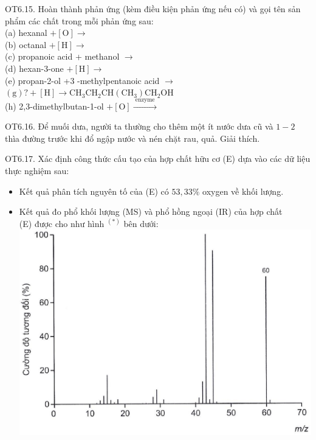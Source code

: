 \documentclass[10pt]{article}
\begin{document}
OT6.15. Hoàn thành phản ứng (kèm điều kiện phản ứng nếu có) và gọi tên sản\\
phẩm các chất trong mỗi phản ứng sau:\\
(a) hexanal $+[\mathrm{O}] \rightarrow$\\
(b) octanal $+[\mathrm{H}] \rightarrow$\\
(c) propanoic acid + methanol $\rightarrow$\\
(d) hexan-3-one $+[\mathrm{H}] \rightarrow$\\
(e) propan-2-ol +3 -methylpentanoic acid $\rightarrow$\\
$(\mathrm{g}) ?+[\mathrm{H}] \rightarrow \mathrm{CH}_{3} \mathrm{CH}_{2} \mathrm{CH}\left(\mathrm{CH}_{3}\right) \mathrm{CH}_{2} \mathrm{OH}$\\
(h) 2,3-dimethylbutan-1-ol $+[\mathrm{O}] \xrightarrow{\text { enzyme }}$

OT6.16. Để muối dưa, người ta thường cho thêm một ít nước dưa cũ và $1-2$ thìa đường trước khi đổ ngập nước và nén chặt rau, quả. Giải thích.

OT6.17. Xác định công thức cấu tạo của hợp chất hữu cơ (E) dựa vào các dữ liệu thực nghiệm sau:

\begin{itemize}
  \item Kết quả phân tích nguyên tố của (E) có $53,33 \%$ oxygen về khối lượng.
  \item Kết quả đo phổ khối lượng (MS) và phổ hồng ngoại (IR) của hợp chất\\
(E) được cho như hình ${ }^{(*)}$ bên dưới:\\
\includegraphics[max width=\textwidth, center]{2025_10_23_ae7aef68fb3b41082d29g-50}
\end{itemize}
\end{document}

